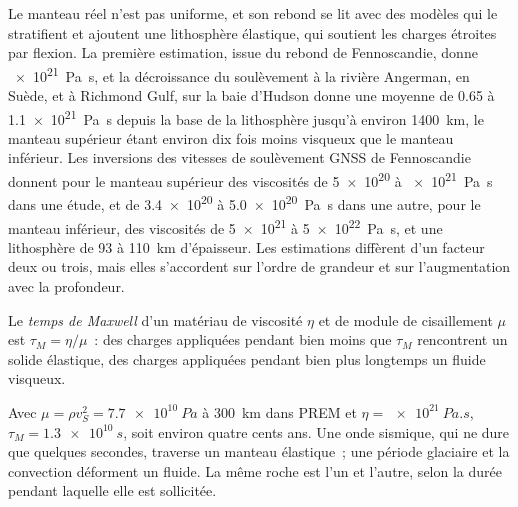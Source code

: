 Le manteau réel n'est pas uniforme, et son rebond se lit avec des modèles qui le stratifient
et ajoutent une lithosphère élastique, qui soutient les charges étroites par flexion. La
première estimation, issue du rebond de Fennoscandie, donne \qty{e21}{Pa.s}, et la
décroissance du soulèvement à la rivière Angerman, en Suède, et à Richmond Gulf, sur la baie
d'Hudson donne une moyenne de 0.65 à \qty{1.1e21}{Pa.s} depuis la base de la
lithosphère jusqu'à environ \qty{1400}{km}, le manteau supérieur étant environ dix fois
moins visqueux que le manteau inférieur. Les inversions des vitesses de soulèvement GNSS de
Fennoscandie donnent pour le manteau supérieur des viscosités de \num{5e20} à \qty{e21}{Pa.s}
dans une étude, et de \num{3.4e20} à \qty{5.0e20}{Pa.s} dans une autre, pour le manteau
inférieur, des viscosités de \num{5e21} à \qty{5e22}{Pa.s}, et une lithosphère de 93 à
\qty{110}{km} d'épaisseur. Les estimations diffèrent d'un facteur deux ou trois, mais elles
s'accordent sur l'ordre de grandeur et sur l'augmentation avec la profondeur.

\begin{definition}\label{def:b3:mantle-convection:maxwell}
Le \emph{temps de Maxwell} d'un matériau de viscosité $\eta$
et de module de cisaillement $\mu$ est $\tau_M = \eta/\mu$~: des charges appliquées pendant bien moins que
$\tau_M$ rencontrent un solide élastique, des charges appliquées pendant bien plus longtemps un fluide visqueux.
\end{definition}

Avec $\mu = \rho v_S^2 = \qty{7.7e10}{Pa}$ à \qty{300}{km} dans PREM et $\eta =
\qty{e21}{Pa.s}$, $\tau_M = \qty{1.3e10}{s}$, soit environ quatre cents ans. Une
onde sismique, qui ne dure que quelques secondes, traverse un manteau élastique~; une période glaciaire et
la convection déforment un fluide. La même roche est l'un et l'autre, selon la durée
pendant laquelle elle est sollicitée.

